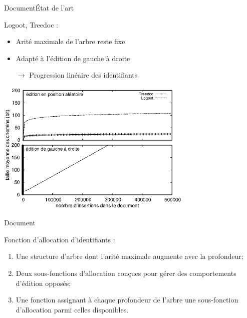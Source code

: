 \begin{frame}{Document}{État de l'art}
  
  Logoot,
  Treedoc : 
  \begin{itemize}
  \item Arité maximale de l'arbre reste fixe
  \item Adapté à l'édition de gauche à droite
  \item [$\rightarrow$] Progression linéaire des identifiants
  \end{itemize}

  \begin{center}
    \includegraphics[width=0.7\textwidth]{img/replication/motivationartificial.eps}
  \end{center}
  \vspace{0.025cm}

\end{frame}


\begin{frame}{Document}{\LSEQ}
  
  Fonction d'allocation d'identifiants :
  \begin{enumerate}
  \item Une structure d'arbre dont l'arité maximale augmente avec la profondeur;
  \item Deux sous-fonctions d'allocation conçues pour gérer des comportements
    d'édition opposés;
  \item Une fonction assignant à chaque profondeur de l'arbre une sous-fonction
    d'allocation parmi celles disponibles.
  \end{enumerate}
  
\end{frame}


